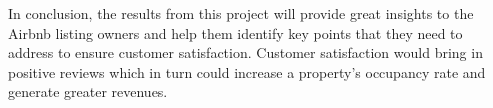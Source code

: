 \documentclass[11pt]{article}
\begin{document}
\noindent In conclusion, the results from this project will provide great insights to the Airbnb listing owners and help them identify key points that they need to address to ensure customer satisfaction. Customer satisfaction would bring in positive reviews which in turn could increase a property’s occupancy rate and generate greater revenues.
\end{document}
